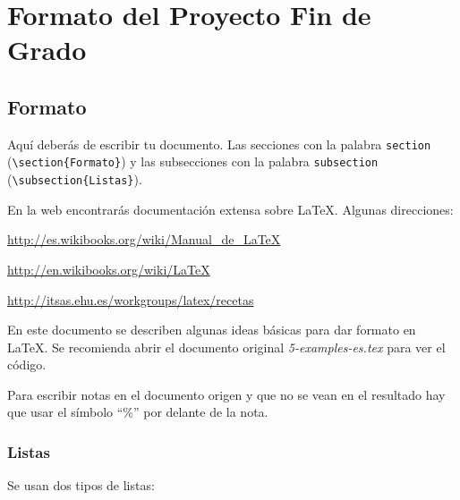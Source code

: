 \chapter{Formato del Proyecto Fin de Grado}
\label{ch:presentacion}




\section{Formato}
\label{secc:formato}

Aquí deberás de escribir tu documento. Las secciones con la palabra \texttt{section} (\verb+\section{Formato}+) y las subsecciones con la palabra  \texttt{subsection} (\verb+\subsection{Listas}+).

En la web encontrarás documentación extensa sobre \LaTeX{}. Algunas direcciones:  


\vspace{0.25cm}

\url{http://es.wikibooks.org/wiki/Manual\_de\_LaTeX}

\url{http://en.wikibooks.org/wiki/LaTeX}

\url{http://itsas.ehu.es/workgroups/latex/recetas}

\vspace{0.25 cm}

En este documento se describen algunas ideas básicas para dar formato en \LaTeX{}. Se recomienda abrir el documento original \emph{5-examples-es.tex} para ver el código. 

Para escribir notas en el documento origen y que no se vean en el resultado hay que usar el símbolo  ``\%'' por delante de la nota.




\subsection{Listas}
\label{subsecc:listas}

Se usan dos tipos de listas:

